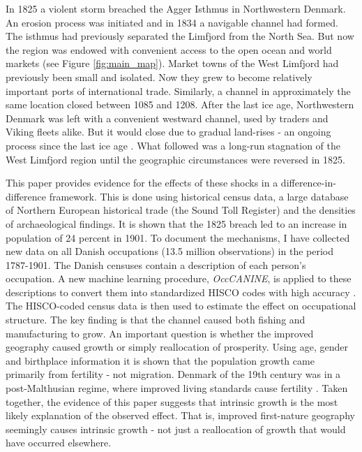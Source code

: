 \documentclass[11pt]{article}
\begin{document}
In 1825 a violent storm breached the Agger Isthmus in Northwestern Denmark. An erosion process was initiated and in 1834 a navigable channel had formed. The isthmus had previously separated the Limfjord from the North Sea. But now the region was endowed with convenient access to the open ocean and world markets (see Figure \ref{fig:main_map}). Market towns of the West Limfjord had previously been small and isolated. Now they grew to become relatively important ports of international trade. Similarly, a channel in approximately the same location closed between 1085 and 1208. After the last ice age, Northwestern Denmark was left with a convenient westward channel, used by traders and Viking fleets alike. But it would close due to gradual land-rises - an ongoing process since the last ice age \citep{Christensen2004}. What followed was a long-run stagnation of the West Limfjord region until the geographic circumstances were reversed in 1825.

This paper provides evidence for the effects of these shocks in a difference-in-difference framework. This is done using historical census data, a large database of Northern European historical trade (the Sound Toll Register) and the densities of archaeological findings. It is shown that the 1825 breach led to an increase in population of 24 percent in 1901. To document the mechanisms, I have collected new data on all Danish occupations (13.5 million observations) in the period 1787-1901. The Danish censuses contain a description of each person's occupation. A new machine learning procedure, \textit{OccCANINE}, is applied to these descriptions to convert them into standardized HISCO codes with high accuracy \citep{leeuwen2002hisco, dahl2024breaking}. The HISCO-coded census data is then used to estimate the effect on occupational structure. The key finding is that the channel caused both fishing and manufacturing to grow. An important question is whether the improved geography caused growth or simply reallocation of prosperity. Using age, gender and birthplace information it is shown that the population growth came primarily from fertility - not migration. Denmark of the 19th century was in a post-Malthusian regime, where improved living standards cause fertility \citep{Jensen2022, Galor2011}. Taken together, the evidence of this paper suggests that intrinsic growth is the most likely explanation of the observed effect. That is, improved first-nature geography seemingly causes intrinsic growth - not just a reallocation of growth that would have occurred elsewhere.
\end{document}
